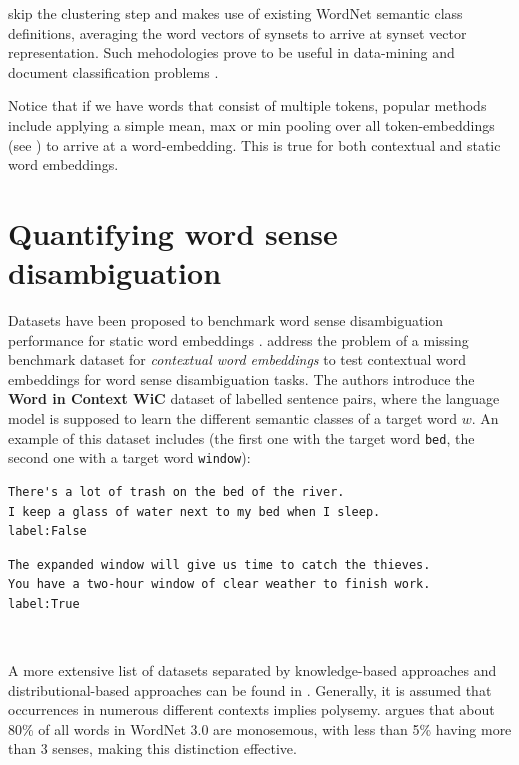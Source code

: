\documentclass[a4paper,12pt,oneside,openright]{report}
\begin{document}
\cite{remus18} skip the clustering step and makes use of existing WordNet semantic class definitions, averaging the word vectors of synsets to arrive at synset vector representation.
Such mehodologies prove to be useful in data-mining and document classification problems \cite{reimers19}.

Notice that if we have words that consist of multiple tokens, popular methods include applying a simple mean, max or min pooling over all token-embeddings (see \cite{bommasani19, akbik19, may19}) to arrive at a word-embedding. 
This is true for both contextual and static word embeddings. \\

\section{Quantifying word sense disambiguation}

Datasets have been proposed to benchmark word sense disambiguation performance for static word embeddings \cite{bruni13, hill15}.
\cite{pilehvar19} address the problem of a missing benchmark dataset for \textit{contextual word embeddings} to test contextual word embeddings for word sense disambiguation tasks.
The authors introduce the \textbf{Word in Context WiC} dataset of labelled sentence pairs, where the language model is supposed to learn the different semantic classes of a target word $w$. 
An example of this dataset includes (the first one with the target word \Verb#bed#, the second one with a target word \Verb#window#): \\

\begin{tcolorbox}
\begin{verbatim}
There's a lot of trash on the bed of the river.
I keep a glass of water next to my bed when I sleep.
label:False
\end{verbatim}
\end{tcolorbox}

\quad

\begin{tcolorbox}
\begin{verbatim}
The expanded window will give us time to catch the thieves.
You have a two-hour window of clear weather to finish work.
label:True
\end{verbatim} \\
\end{tcolorbox} 

A more extensive list of datasets separated by knowledge-based approaches and distributional-based approaches can be found in \cite{camachocollados18, liebeskind19, navigli19}.
Generally, it is assumed that occurrences in numerous different contexts implies polysemy.
\cite{camachocollados18} argues that about 80\% of all words in WordNet  3.0 are monosemous, with less than 5\% having more than 3 senses, making this distinction effective. \\
\end{document}
